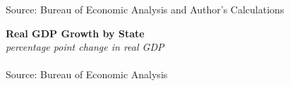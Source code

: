 \documentclass{report}
\begin{document}
\footnotesize{Source: Bureau of Economic Analysis and Author's Calculations}
\newpage 
\vspace{-4mm}

\noindent \normalsize \textbf{Real GDP Growth by State}\\
\footnotesize{\textit{percentage point change in real GDP}}\\
\vspace{-2mm}
\hspace{-12mm}  \\
\footnotesize{Source: Bureau of Economic Analysis}

\begin{minipage}{0.76\textwidth} 
\small  
\end{minipage}
\vspace{2mm}
\end{document}
